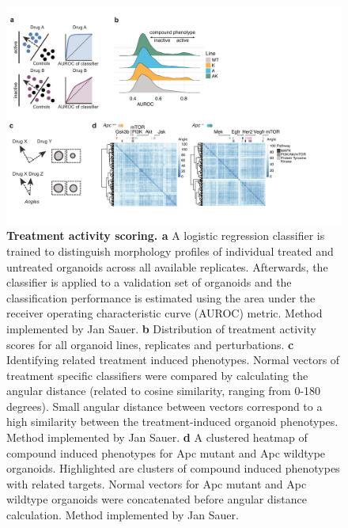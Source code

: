 \begin{flushleft}
\begin{figure}[h!]
\centering
\includegraphics[width=\textwidth,
                height=\textheight,
                keepaspectratio]{figures/adenomaprofiling/pdf/fig_1_5_2.pdf}
\caption[Treatment activity scoring]{\textbf{Treatment activity scoring. a} A logistic regression classifier is trained to distinguish morphology profiles of individual treated and untreated organoids across all available replicates. Afterwards, the classifier is applied to a validation set of organoids and the classification performance is estimated using the area under the receiver operating characteristic curve (AUROC) metric. Method implemented by Jan Sauer.
\textbf{b} Distribution of treatment activity scores for all organoid lines, replicates and perturbations. 
\textbf{c} Identifying related treatment induced phenotypes. Normal vectors of treatment specific classifiers were compared by calculating the angular distance (related to cosine similarity, ranging from 0-180 degrees). Small angular distance between vectors correspond to a high similarity between the treatment-induced organoid phenotypes. Method implemented by Jan Sauer.
\textbf{d} A clustered heatmap of compound induced phenotypes for Apc mutant and Apc wildtype organoids. Highlighted are clusters of compound induced phenotypes with related targets. Normal vectors for Apc mutant and Apc wildtype organoids were concatenated before angular distance calculation. Method implemented by Jan Sauer.
}
\label{fig_150}
\end{figure}
\bigbreak


\end{flushleft}
